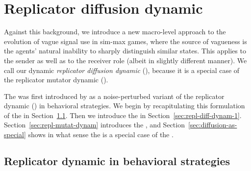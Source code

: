 \section{Replicator diffusion dynamic}
\label{sec:repl-diff-dynam}

Against this background, we introduce a new macro-level approach to
the evolution of vague signal use in sim-max games, where the source
of vagueness is the agents' natural inability to sharply distinguish
similar states. This applies to the sender as well as to
the receiver role (albeit in slightly different manner). We call our
dynamic \emph{replicator diffusion dynamic} (\rdd), because it is a
special case of the replicator mutator dynamic (\rmd).

The \rdd was first introduced by \citet{Correia2013:The-Bivalent-Tr}
as a noise-perturbed variant of the replicator dynamic (\rd) in
behavioral strategies. We begin by recapitulating this formulation of
the \rd in Section~\ref{sec:repl-dynam-behav}. Then we introduce the
\rdd in Section~\ref{sec:repl-diff-dynam-1}.
Section~\ref{sec:repl-mutat-dynam} introduces the \rmd, and
Section~\ref{sec:diffusion-as-special} shows in what sense the \rdd is
a special case of the \rdd.

\subsection{Replicator dynamic in behavioral strategies}
\label{sec:repl-dynam-behav}

